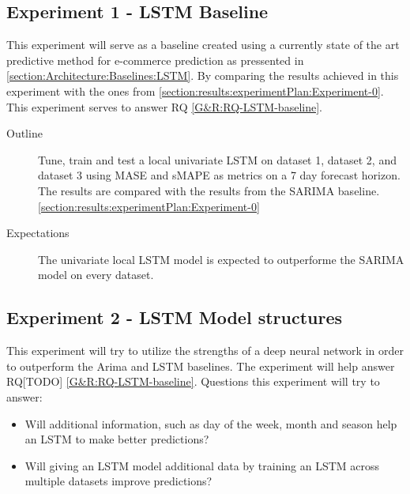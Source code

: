 \subsection{Experiment 1 - LSTM Baseline}
\label{section:results:experimentPlan:Experiment-1}
This experiment will serve as a baseline created using a currently state of the art predictive method
for e-commerce prediction as pressented in \cref{section:Architecture:Baselines:LSTM}.
By comparing the results achieved in this experiment with the ones from \cref{section:results:experimentPlan:Experiment-0}.
This experiment serves to answer RQ \cref{G&R:RQ-LSTM-baseline}.

\begin{description}
  \item[Outline]{
                  Tune, train and test a local univariate LSTM on dataset 1,
                  dataset 2, and dataset 3 using MASE and sMAPE as metrics on a 7 day forecast horizon.
                  The results are compared with the results from the SARIMA baseline. \cref{section:results:experimentPlan:Experiment-0}}
\end{description}

\begin{description}
  \item[Expectations]{
                      The univariate local LSTM model is expected to outperforme the SARIMA model on every dataset.                    
                     }
\end{description}




\subsection{Experiment 2 - LSTM Model structures}
This experiment will try to utilize the strengths of a deep neural network
in order to outperform the Arima and LSTM baselines. The experiment will
help answer RQ[TODO] \cref{G&R:RQ-LSTM-baseline}.
Questions this experiment will try to answer:
\begin{itemize}
  \item Will additional information, such as day of the week, month and season help an LSTM to make better predictions?
  \item {Will giving an LSTM model additional data by training an LSTM across multiple datasets improve predictions?}
\end{itemize}

